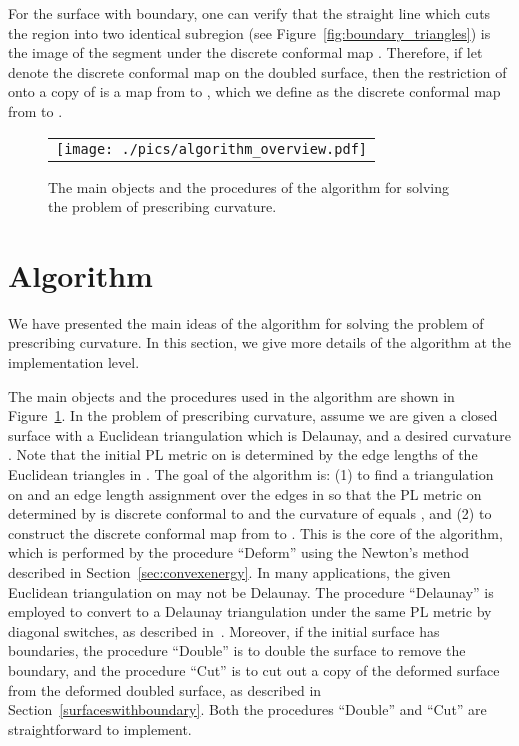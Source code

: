 \documentclass[11pt]{article}
\begin{document}
For the surface  with boundary, one can verify that the straight line which cuts the region 
 into two identical subregion (see Figure~\ref{fig:boundary_triangles}) is 
the image of the segment  under the discrete conformal map . 
Therefore, if let  denote the discrete conformal map on the doubled surface, then the restriction 
of  onto a copy of  is a map from  to , which we define as the discrete 
conformal map  from  to . 

\begin{figure}[!t]
\begin{center}
\begin{tabular}{c}
\texttt{[image: ./pics/algorithm\_overview.pdf]}
\end{tabular}
\end{center}
\vspace{0.1in}
\caption{The main objects and the procedures of the algorithm for solving 
the problem of prescribing curvature. 
\label{fig:algorithm_overview}}
\end{figure}



\section{Algorithm}
\label{sec:algorithm}
We have presented the main ideas of the algorithm for solving the problem 
of prescribing curvature. In this section, we give more details of the algorithm at 
the implementation level. 


The main objects and the procedures used in the algorithm are shown in Figure~\ref{fig:algorithm_overview}. 
In the problem of prescribing curvature, assume we are given a closed surface  with 
a Euclidean triangulation  which is Delaunay, and a desired curvature
. Note that the initial PL metric  on 
is determined by the edge lengths of the Euclidean triangles in . The goal of the algorithm is: 
(1) to find a triangulation  on  and an edge length assignment  
over the edges in  so that the PL metric  on  determined by 
is discrete conformal to  and the curvature of  equals , 
and (2) to construct the discrete conformal map  from  to . This is the 
core of the algorithm, which is performed by the procedure ``Deform'' using the Newton's method
described in Section~\ref{sec:convexenergy}. In many applications, 
the given Euclidean triangulation  on  may not be Delaunay. The procedure 
``Delaunay'' is employed to convert  to a Delaunay triangulation  under the same PL metric
by diagonal switches, as described in~\cite{Fisher:2006}. 
Moreover, if the initial surface has boundaries, the procedure ``Double'' is to double the surface 
to remove the boundary, and the procedure ``Cut'' is to cut out a copy of the deformed surface 
from the deformed doubled surface, as described in Section~\ref{surfaceswithboundary}. 
Both the procedures ``Double'' and ``Cut'' are straightforward to implement. 
\end{document}
